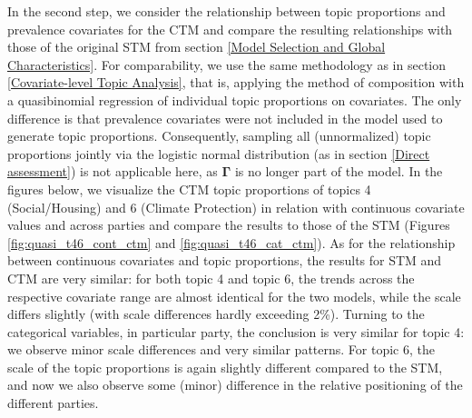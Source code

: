 In the second step, we consider the relationship between topic proportions and prevalence covariates for the CTM and compare the resulting relationships with those of the original STM from section \ref{Model Selection and Global Characteristics}. For comparability, we use the same methodology as in section \ref{Covariate-level Topic Analysis}, that is, applying the method of composition with a quasibinomial regression of individual topic proportions on covariates. The only difference is that prevalence covariates were not included in the model used to generate topic proportions. Consequently, sampling all (unnormalized) topic proportions jointly via the logistic normal distribution (as in section \ref{Direct assessment}) is not applicable here, as $\boldsymbol{\Gamma}$ is no longer part of the model. In the figures below, we visualize the CTM topic proportions of topics 4 (Social/Housing) and 6 (Climate Protection) in relation with continuous covariate values and across parties and compare the results to those of the STM (Figures \ref{fig:quasi_t46_cont_ctm} and \ref{fig:quasi_t46_cat_ctm}). As for the relationship between continuous covariates and topic proportions, the results for STM and CTM are very similar: for both topic 4 and topic 6, the trends across the respective covariate range are almost identical for the two models, while the scale differs slightly (with scale differences hardly exceeding 2\%). Turning to the categorical variables, in particular party, the conclusion is very similar for topic 4: we observe minor scale differences and very similar patterns. For topic 6, the scale of the topic proportions is again slightly different compared to the STM, and now we also observe some (minor) difference in the relative positioning of the different parties. 

